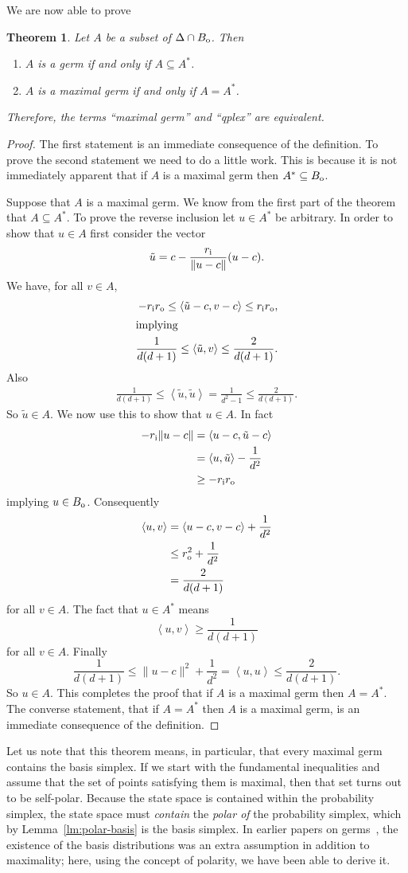\documentclass[aps,pra,superscriptaddress,10pt,tightenlines,twocolumn,nofootinbib]{revtex4}
\newtheorem{theorem}{Theorem}
\theoremstyle{remark}
\newcommand{\be}{\begin{equation}}
\newcommand{\ee}{\end{equation}}
\newcommand{\ea}[1]{\begin{align}#1\end{align}}
\newcommand{\la}{\langle}
\newcommand{\ra}{\rangle}
\newcommand{\ps}{\Delta}
\newcommand{\dl}[1]{#1^{*}}
\newcommand{\bo}{B_{\rm{o}}}
\newcommand{\ro}{r_{\rm{o}}}
\newcommand{\ri}{r_{\rm{i}}}
\newcommand{\inprod}[2]{{\left\langle #1 , #2 \right\rangle}}
\begin{document}
We are now able to prove
\begin{theorem}
\label{tm:qplexPolarity}
Let $A$ be a subset of $\ps\cap \bo$. Then
\begin{enumerate}
\item $A$ is a germ if and only if $A \subseteq \dl{A}$.
\item $A$ is a maximal germ if and only if $A = \dl{A}$.
\end{enumerate}
Therefore, the terms ``maximal germ'' and ``qplex'' are equivalent.
\end{theorem}
\begin{proof}
The first statement is an immediate consequence of the definition.  To
prove the second statement we need to do a little work.  This is
because it is not immediately apparent that if $A$ is a maximal germ then
$\dl{A}\subseteq \bo$.

Suppose that $A$ is a maximal germ.  We know from the first part of the theorem that $A \subseteq \dl{A}$.  To prove the reverse inclusion  let $u\in \dl{A}$ be arbitrary.
In order to show that $u\in A$ first consider the vector
\be
\tilde{u} = c - \frac{\ri}{\|u-c\|} (u-c).
\ee
We have, for all $v\in A$,
\ea{
-\ri \ro \le \inprod{\tilde{u}-c}{v-c}  \le \ri\ro,
\\
\intertext{implying}
\frac{1}{d(d+1)} \le \inprod{\tilde{u}}{v} \le \frac{2}{d(d+1)}.
}
Also
\ea{
\frac{1}{d(d+1)} \le \inprod{\tilde{u}}{\tilde{u}} = \frac{1}{d^2-1} \le \frac{2}{d(d+1)}.
}
So $\tilde{u} \in A$.  We now use this to show that $u \in A$.  In fact
\ea{
-\ri \|u-c\| &= \inprod{u-c}{\tilde{u}-c}
\nonumber
\\
&= \inprod{u}{\tilde{u}} - \frac{1}{d^2}
\nonumber
\\
& \ge
-\ri \ro
}
implying
$u  \in \bo$.
Consequently
\ea{
\la u,v \ra &= \inprod{u-c}{v-c} + \frac{1}{d^2}
\nonumber
\\
&\le \ro^2 + \frac{1}{d^2}
\nonumber
\\
& = \frac{2}{d(d+1)}
}
for all $v\in A$.  The fact that $u\in \dl{A}$ means
\be
\inprod{u}{v} \ge \frac{1}{d(d+1)}
\ee
for all $v \in A$.  Finally
\be
\frac{1}{d(d+1)} \le   \|u-c\|^2 +\frac{1}{d^2} =   \inprod{u}{u} \le \frac{2}{d(d+1)}.
\ee
So $u\in A$.  This completes the proof that if $A$ is a maximal germ then $A=\dl{A}$.  The  converse statement, that if $A=\dl{A}$ then $A$ is a maximal germ, is an immediate consequence of the definition.
\end{proof}

Let us note that this theorem means, in particular, that every maximal
germ contains the basis simplex.  If we start with the fundamental
inequalities and assume that the set of points satisfying them is
maximal, then that set turns out to be self-polar.  Because the state
space is contained within the probability simplex, the state space
must \emph{contain} the \emph{polar of} the probability simplex, which
by Lemma~\ref{lm:polar-basis} is the basis simplex.  In earlier
papers on germs~\cite{fuchs2009, appleby2011, fuchs2013}, the existence of the
basis distributions was an extra assumption in addition to maximality; here,
using the concept of polarity, we have been able to derive it.
\end{document}
